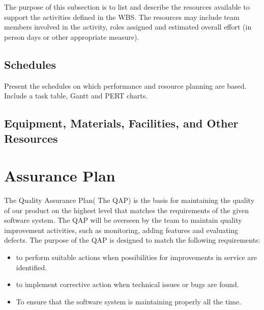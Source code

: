 \documentclass{l3deliverable}
\begin{document}
{\begin{table}[ht]
\begin{tabular}{|c |c |c |c |c |}
\hline %
\end{tabular}
\label{table:nonlin} %
\end{table}

The purpose of this subsection is to list and describe the resources
available to support the activities defined in the WBS. The resources
may include team members involved in the activity, roles assigned and
estimated overall effort (in person days or other appropriate
measure).


\subsection{Schedules}

Present the schedules on which performance and resource planning are
based. Include a task table, Gantt and PERT charts.


\subsection{Equipment, Materials, Facilities, and Other Resources}


\section{Assurance Plan}


The Quality Assurance Plan( The QAP) is the basis for maintaining the quality of our product on the highest level that matches the requirements of the given software system. The QAP will be overseen by the team to maintain quality improvement activities, such as monitoring, adding features and evaluating defects. The purpose of the QAP is designed to match the following requirements:\\

\begin{itemize}
\item to perform suitable actions when possibilities for improvements in service are identified.\\
\item to implement corrective action when technical issues or bugs are found.\\
\item To ensure that the software system is maintaining properly all the time.\\
\end{itemize}

}
\end{document}
